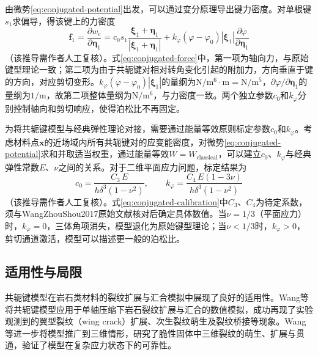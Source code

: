 由微势\eqref{eq:conjugated-potential}出发，可以通过变分原理导出键力密度。对单根键$s_{1}$求偏导，得该键上的力密度
\begin{equation}
  \mathbf{f}_{1}=\frac{\partial w_{\mathrm{c}}}{\partial\boldsymbol{\eta}_{1}}=c_{0}s_{1}\frac{\boldsymbol{\xi}_{1}+\boldsymbol{\eta}_{1}}{|\boldsymbol{\xi}_{1}+\boldsymbol{\eta}_{1}|}+k_{\varphi}(\varphi-\varphi_{0})|\boldsymbol{\xi}_{1}|\frac{\partial\varphi}{\partial\boldsymbol{\eta}_{1}}
  \label{eq:conjugated-force}
\end{equation}
（该推导需作者人工复核）。式\eqref{eq:conjugated-force}中，第一项为轴向力，与原始键型理论一致；第二项为由于共轭键对相对转角变化引起的附加力，方向垂直于键的方向，对应剪切变形。$k_{\varphi}(\varphi-\varphi_{0})|\boldsymbol{\xi}_{1}|$的量纲为$\mathrm{N}/\mathrm{m}^{6}\cdot\mathrm{m}=\mathrm{N}/\mathrm{m}^{5}$，$\partial\varphi/\partial\boldsymbol{\eta}_{1}$的量纲为$1/\mathrm{m}$，故第二项整体量纲为$\mathrm{N}/\mathrm{m}^{6}$，与力密度一致。两个独立参数$c_{0}$和$k_{\varphi}$分别控制轴向和剪切响应，使得泊松比不再固定。

为将共轭键模型与经典弹性理论对接，需要通过能量等效原则标定参数$c_{0}$和$k_{\varphi}$。考虑材料点$\mathbf{x}$的近场域内所有共轭键对的应变能密度，对微势\eqref{eq:conjugated-potential}求和并取适当权重，通过能量等效$W=W_{\mathrm{classical}}$，可以建立$c_{0}$、$k_{\varphi}$与经典弹性常数$E$、$\nu$之间的关系。对于二维平面应力问题，标定结果为
\begin{equation}
  c_{0}=\frac{C_{3}\,E}{h\delta^{3}(1-\nu^{2})},
  \qquad
  k_{\varphi}=\frac{C_{4}\,E(1-3\nu)}{h\delta^{3}(1-\nu^{2})}
  \label{eq:conjugated-calibration}
\end{equation}
（该推导需作者人工复核）。式\eqref{eq:conjugated-calibration}中$C_{3}$、$C_{4}$为待定系数，须与WangZhouShou2017原始文献核对后确定具体数值。当$\nu=1/3$（平面应力）时，$k_{\varphi}=0$，三体角项消失，模型退化为原始键型理论；当$\nu<1/3$时，$k_{\varphi}>0$，剪切通道激活，模型可以描述更一般的泊松比。


\subsection{适用性与局限}\label{sec:conjugated-review}

共轭键模型在岩石类材料的裂纹扩展与汇合模拟中展现了良好的适用性。Wang等\cite{WangZhouShou2017}将共轭键模型应用于单轴压缩下岩石裂纹扩展与汇合的数值模拟，成功再现了实验观测到的翼型裂纹（wing crack）扩展、次生裂纹萌生及裂纹桥接等现象。Wang等\cite{WangZhouWang2018}进一步将模型推广到三维情形，研究了脆性固体中三维裂纹的萌生、扩展与贯通，验证了模型在复杂应力状态下的可靠性。

